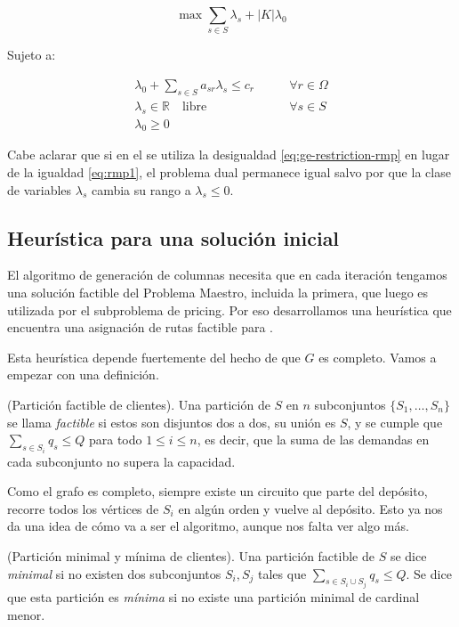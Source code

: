 \begin{equation}
    \max \sum_{s \in S} \lambda_s + |K| \lambda_0 
\end{equation}

Sujeto a:

\begin{align}
    \lambda_0 + \sum_{s \in S} {a_{sr} \lambda_s} \leq c_r \qquad & \forall {r \in \Omega} \\
\lambda_s \in \mathbb{R} \quad \text{libre}
\qquad &\forall {s \in S} \\
\lambda_0 \geq 0 &
\end{align}

Cabe aclarar que si en el  se utiliza la desigualdad \ref{eq:ge-restriction-rmp} en lugar de la igualdad \ref{eq:rmp1}, el problema dual permanece igual salvo por que la clase de variables $\lambda_s$ cambia su rango a $\lambda_s \leq 0$. 


\subsection{Heurística para una solución inicial}
\label{section:initial-solution-heuristic}

El algoritmo de generación de columnas necesita que en cada iteración tengamos una solución factible del Problema Maestro, incluida la primera, que luego es utilizada por el subproblema de pricing. Por eso desarrollamos una heurística que encuentra una asignación de rutas factible para .

Esta heurística depende fuertemente del hecho de que $G$ es completo. Vamos a empezar con una definición.

\begin{definition}
    (Partición factible de clientes).
    Una partición de $S$ en $n$ subconjuntos $\{S_1, \dots, S_n\}$ se llama \emph{factible} si estos son disjuntos dos a dos, su unión es $S$, y se cumple que $\sum_{s \in S_i} q_s \leq Q$ para todo $1 \leq i \leq n$, es decir, que la suma de las demandas en cada subconjunto no supera la capacidad.
\end{definition}

Como el grafo es completo, siempre existe un circuito que parte del depósito, recorre todos los vértices de $S_i$ en algún orden y vuelve al depósito. Esto ya nos da una idea de cómo va a ser el algoritmo, aunque nos falta ver algo más. 

\begin{definition}
    (Partición minimal y mínima de clientes).
    Una partición factible de $S$ se dice \emph{minimal} si no existen dos subconjuntos $S_i, S_j$ tales que $\sum_{s \in S_i \cup S_j} q_s \leq Q$. Se dice que esta partición es \emph{mínima} si no existe una partición minimal de cardinal menor.
\end{definition}

